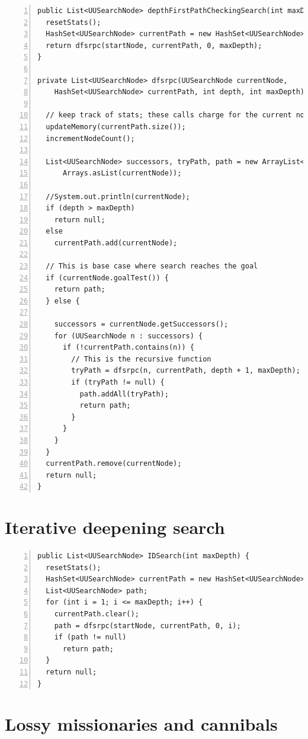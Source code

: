 \documentclass{article}
\begin{document}
\begin{lstlisting}[numbers=left]
public List<UUSearchNode> depthFirstPathCheckingSearch(int maxDepth) {
  resetStats();
  HashSet<UUSearchNode> currentPath = new HashSet<UUSearchNode>();
  return dfsrpc(startNode, currentPath, 0, maxDepth);
}

private List<UUSearchNode> dfsrpc(UUSearchNode currentNode,
    HashSet<UUSearchNode> currentPath, int depth, int maxDepth) {

  // keep track of stats; these calls charge for the current node
  updateMemory(currentPath.size());
  incrementNodeCount();

  List<UUSearchNode> successors, tryPath, path = new ArrayList<UUSearchNode>(
      Arrays.asList(currentNode));

  //System.out.println(currentNode);
  if (depth > maxDepth)
    return null;
  else 
    currentPath.add(currentNode);

  // This is base case where search reaches the goal
  if (currentNode.goalTest()) {
    return path;
  } else {
  
    successors = currentNode.getSuccessors();
    for (UUSearchNode n : successors) {
      if (!currentPath.contains(n)) {
        // This is the recursive function
        tryPath = dfsrpc(n, currentPath, depth + 1, maxDepth);
        if (tryPath != null) {
          path.addAll(tryPath);
          return path;
        }
      }
    }
  }
  currentPath.remove(currentNode);
  return null;
}
\end{lstlisting}

\section{Iterative deepening search}

\begin{lstlisting}[numbers=left]
public List<UUSearchNode> IDSearch(int maxDepth) {
  resetStats();
  HashSet<UUSearchNode> currentPath = new HashSet<UUSearchNode>();
  List<UUSearchNode> path;
  for (int i = 1; i <= maxDepth; i++) {
    currentPath.clear();
    path = dfsrpc(startNode, currentPath, 0, i);
    if (path != null)
      return path;
  }
  return null;
}
\end{lstlisting}

\section{Lossy missionaries and cannibals}
\end{document}
